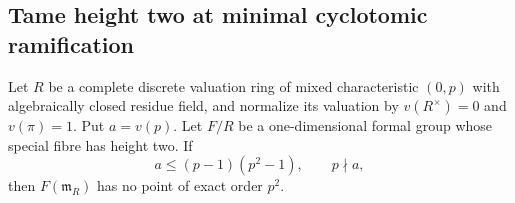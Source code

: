 \subsection{Tame height two at minimal cyclotomic ramification}

\begin{lemma}
\label{lem:B-RD49-point}
Let $R$ be a complete discrete valuation ring of mixed characteristic
$(0,p)$ with algebraically closed residue field, and normalize its
valuation by $v(R^\times)=0$ and $v(\pi)=1$. Put $a=v(p)$.
Let $F/R$ be a one-dimensional formal group whose special fibre has
height two. If
\[
             a\leq(p-1)(p^2-1),\qquad p\nmid a,
                                                        \tag{B-RD49.1}
\]
then $F(\mathfrak m_R)$ has no point of exact order $p^2$.
\end{lemma}
